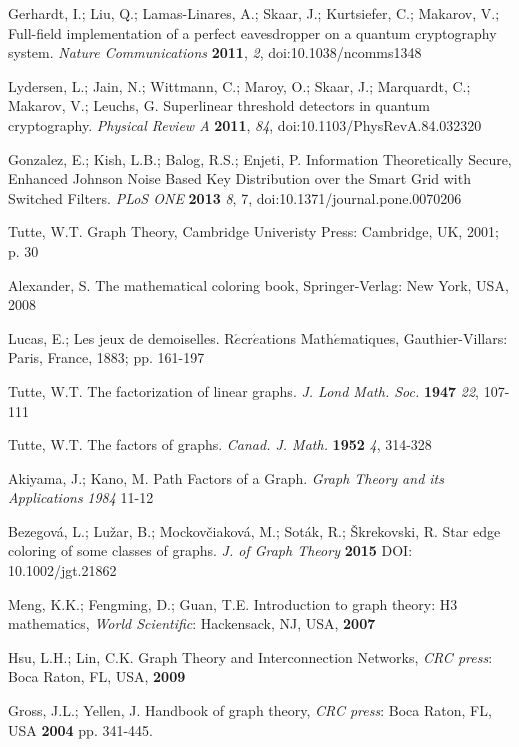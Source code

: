 \documentclass[a4paper,12pt,pdftex]{article}
\begin{document}
\begin{thebibliography}{99}
Gerhardt, I.; Liu, Q.; Lamas-Linares, A.; Skaar, J.; Kurtsiefer, C.; Makarov, V.; Full-field implementation of a perfect eavesdropper on a quantum cryptography system. {\em Nature Communications} {\bf 2011}, {\em 2}, doi:10.1038/ncomms1348

Lydersen, L.; Jain, N.; Wittmann, C.; Maroy, O.; Skaar, J.; Marquardt, C.; Makarov, V.; Leuchs, G. Superlinear threshold detectors in quantum cryptography. {\em Physical Review A} {\bf 2011}, {\em 84}, doi:10.1103/PhysRevA.84.032320





Gonzalez, E.; Kish, L.B.; Balog, R.S.; Enjeti, P. Information Theoretically Secure, Enhanced Johnson Noise Based Key Distribution over the Smart Grid with Switched Filters. {\em PLoS ONE} {\bf 2013} {\em 8}, 7, doi:10.1371/journal.pone.0070206



Tutte, W.T. Graph Theory, Cambridge Univeristy Press: Cambridge, UK, 2001; p. 30

Alexander, S. The mathematical coloring book, Springer-Verlag: New York, USA, 2008

Lucas, E.; Les jeux de demoiselles. R$\acute{e}$cr$\acute{e}$ations Math$\acute{e}$matiques, Gauthier-Villars: Paris, France, 1883; pp. 161-197 

Tutte, W.T. The factorization of linear graphs. {\em J. Lond Math. Soc.} {\bf 1947} {\em 22}, 107-111

Tutte, W.T. The factors of graphs. {\em Canad. J. Math.} {\bf 1952} {\em 4}, 314-328

Akiyama, J.; Kano, M. Path Factors of a Graph. {\em Graph Theory and its Applications} {\em 1984} 11-12

Bezegov{\'a}, L.; Lu{\v{z}}ar, B.; Mockov{\v{c}}iakov{\'a}, M.; Sot{\'a}k, R.; {\v{S}}krekovski, R. Star edge coloring of some classes of graphs. {\em J. of Graph Theory} {\bf 2015} DOI: 10.1002/jgt.21862

Meng, K.K.; Fengming, D.; Guan, T.E. Introduction to graph theory: H3 mathematics, {\em World Scientific}: Hackensack, NJ, USA, {\bf 2007}

Hsu, L.H.; Lin, C.K. Graph Theory and Interconnection Networks, {\em CRC press}: Boca Raton, FL, USA, {\bf 2009}

Gross, J.L.; Yellen, J. Handbook of graph theory, {\em CRC press}: Boca Raton, FL, USA {\bf 2004} pp. 341-445.


\end{thebibliography}
\end{document}
